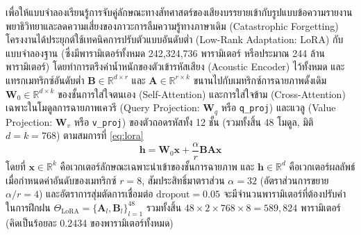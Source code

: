 เพื่อให้แบบจำลองเรียนรู้การจับคู่ลักษณะทางสัทศาสตร์ของเสียงบรรยายเข้ากับรูปแบบข้อความรายงานพยาธิวิทยาและลดความเสี่ยงของภาวะการลืมความรู้ทางภาษาเดิม (Catastrophic Forgetting) โครงงานได้ประยุกต์ใช้เทคนิคการปรับตัวแบบอันดับต่ำ (Low-Rank Adaptation: LoRA) \cite{hu2021lora} กับแบบจำลองฐาน  \cite{radford2023whisper} (ซึ่งมีพารามิเตอร์ทั้งหมด 242,324,736 พารามิเตอร์ หรือประมาณ 244 ล้านพารามิเตอร์) โดยทำการตรึงค่าน้ำหนักของตัวเข้ารหัสเสียง (Acoustic Encoder) ไว้ทั้งหมด และแทรกเมทริกซ์อันดับต่ำ $\mathbf{B} \in \mathbb{R}^{d \times r}$ และ $\mathbf{A} \in \mathbb{R}^{r \times k}$ ขนานไปกับเมทริกซ์การฉายภาพดั้งเดิม $\mathbf{W}_0 \in \mathbb{R}^{d \times k}$ ของชั้นการใส่ใจตนเอง (Self-Attention) และการใส่ใจข้าม (Cross-Attention) เฉพาะในโมดูลการฉายภาพเควรี (Query Projection: $\mathbf{W}_q$ หรือ \texttt{q\_proj}) และแวลู (Value Projection: $\mathbf{W}_v$ หรือ \texttt{v\_proj}) ของตัวถอดรหัสทั้ง 12 ชั้น (รวมทั้งสิ้น 48 โมดูล, มิติ $d = k = 768$) ตามสมการที่ \eqref{eq:lora}
\begin{equation}
\mathbf{h} = \mathbf{W}_0 \mathbf{x} + \frac{\alpha}{r} \mathbf{B}\mathbf{A}\mathbf{x}
\label{eq:lora}
\end{equation}
โดยที่ $\mathbf{x} \in \mathbb{R}^k$ คือเวกเตอร์ลักษณะเฉพาะนำเข้าของชั้นการฉายภาพ และ $\mathbf{h} \in \mathbb{R}^d$ คือเวกเตอร์ผลลัพธ์ เมื่อกำหนดค่าอันดับของเมทริกซ์ $r = 8$, สัมประสิทธิ์มาตราส่วน $\alpha = 32$ (อัตราส่วนการขยาย $\alpha/r = 4$) และอัตราการสุ่มตัดการเชื่อมต่อ $\mathrm{dropout} = 0.05$ จะมีจำนวนพารามิเตอร์ที่ต้องปรับค่าในการฝึกฝน $\Theta_{\mathrm{LoRA}} = \{\mathbf{A}_l, \mathbf{B}_l\}_{l=1}^{48}$ รวมทั้งสิ้น $48 \times 2 \times 768 \times 8 = 589{,}824$ พารามิเตอร์ (คิดเป็นร้อยละ 0.2434 ของพารามิเตอร์ทั้งหมด)

